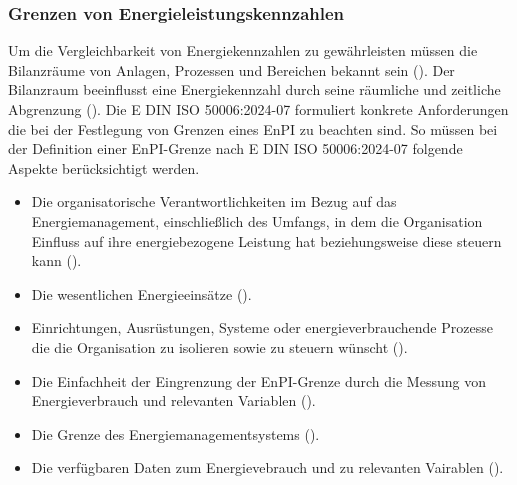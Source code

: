 \subsubsection{Grenzen von Energieleistungskennzahlen}
Um die Vergleichbarkeit von Energiekennzahlen zu gewährleisten müssen die Bilanzräume von Anlagen, Prozessen und Bereichen bekannt sein (\cite[S. 310]{Engelmann.2015}).
Der Bilanzraum beeinflusst eine Energiekennzahl durch seine räumliche und zeitliche Abgrenzung (\cite[S. 6]{Hohnhold.2013}).
Die E DIN ISO 50006:2024-07 formuliert konkrete Anforderungen die bei der Festlegung von Grenzen eines EnPI zu beachten sind.
So müssen bei der Definition einer EnPI-Grenze nach E DIN ISO 50006:2024-07 folgende Aspekte berücksichtigt werden.

\begin{itemize}
    \item Die organisatorische Verantwortlichkeiten im Bezug auf das Energiemanagement, einschließlich des Umfangs, in dem die 
    Organisation Einfluss auf ihre energiebezogene Leistung hat beziehungsweise diese steuern kann (\cite[Kapitel 5.3]{DIN50006.2024}). 
    \item Die wesentlichen Energieeinsätze (\cite[Kapitel 5.3]{DIN50006.2024}). 
    \item Einrichtungen, Ausrüstungen, Systeme oder energieverbrauchende Prozesse die die Organisation zu isolieren sowie zu steuern wünscht (\cite[Kapitel 5.3]{DIN50006.2024}). 
    \item Die Einfachheit der Eingrenzung der EnPI-Grenze durch die Messung von Energieverbrauch und relevanten Variablen (\cite[Kapitel 5.3]{DIN50006.2024}). 
    \item Die Grenze des Energiemanagementsystems (\cite[Kapitel 5.3]{DIN50006.2024}). 
    \item Die verfügbaren Daten zum Energievebrauch und zu relevanten Vairablen (\cite[Kapitel 5.3]{DIN50006.2024}). 
\end{itemize}

